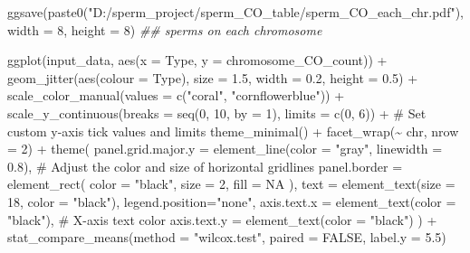 \documentclass[
  letterpaper,
  DIV=11,
  numbers=noendperiod]{scrreprt}
\newenvironment{Shaded}{\begin{snugshade}}{\end{snugshade}}
\newcommand{\AttributeTok}[1]{\textcolor[rgb]{0.40,0.45,0.13}{#1}}
\newcommand{\CommentTok}[1]{\textcolor[rgb]{0.37,0.37,0.37}{#1}}
\newcommand{\ConstantTok}[1]{\textcolor[rgb]{0.56,0.35,0.01}{#1}}
\newcommand{\DecValTok}[1]{\textcolor[rgb]{0.68,0.00,0.00}{#1}}
\newcommand{\DocumentationTok}[1]{\textcolor[rgb]{0.37,0.37,0.37}{\textit{#1}}}
\newcommand{\FloatTok}[1]{\textcolor[rgb]{0.68,0.00,0.00}{#1}}
\newcommand{\FunctionTok}[1]{\textcolor[rgb]{0.28,0.35,0.67}{#1}}
\newcommand{\NormalTok}[1]{\textcolor[rgb]{0.00,0.23,0.31}{#1}}
\newcommand{\SpecialCharTok}[1]{\textcolor[rgb]{0.37,0.37,0.37}{#1}}
\newcommand{\StringTok}[1]{\textcolor[rgb]{0.13,0.47,0.30}{#1}}
\begin{document}
\begin{codelisting}
\begin{Shaded}
\begin{Highlighting}[]
\FunctionTok{ggsave}\NormalTok{(}\FunctionTok{paste0}\NormalTok{(}\StringTok{"D:/sperm\_project/sperm\_CO\_table/sperm\_CO\_each\_chr.pdf"}\NormalTok{), }\AttributeTok{width =} \DecValTok{8}\NormalTok{, }\AttributeTok{height =} \DecValTok{8}\NormalTok{)  }
\DocumentationTok{\#\# sperms on each chromosome}

\FunctionTok{ggplot}\NormalTok{(input\_data, }\FunctionTok{aes}\NormalTok{(}\AttributeTok{x =}\NormalTok{ Type, }\AttributeTok{y =}\NormalTok{ chromosome\_CO\_count)) }\SpecialCharTok{+} 
  \FunctionTok{geom\_jitter}\NormalTok{(}\FunctionTok{aes}\NormalTok{(}\AttributeTok{colour =}\NormalTok{ Type), }\AttributeTok{size =} \FloatTok{1.5}\NormalTok{, }\AttributeTok{width =} \FloatTok{0.2}\NormalTok{, }\AttributeTok{height =} \FloatTok{0.5}\NormalTok{) }\SpecialCharTok{+} 
  \FunctionTok{scale\_color\_manual}\NormalTok{(}\AttributeTok{values =} \FunctionTok{c}\NormalTok{(}\StringTok{"coral"}\NormalTok{, }\StringTok{"cornflowerblue"}\NormalTok{)) }\SpecialCharTok{+}
  \FunctionTok{scale\_y\_continuous}\NormalTok{(}\AttributeTok{breaks =} \FunctionTok{seq}\NormalTok{(}\DecValTok{0}\NormalTok{, }\DecValTok{10}\NormalTok{, }\AttributeTok{by =} \DecValTok{1}\NormalTok{), }\AttributeTok{limits =} \FunctionTok{c}\NormalTok{(}\DecValTok{0}\NormalTok{, }\DecValTok{6}\NormalTok{)) }\SpecialCharTok{+}  \CommentTok{\# Set custom y{-}axis tick values and limits}
  \FunctionTok{theme\_minimal}\NormalTok{() }\SpecialCharTok{+}
  \FunctionTok{facet\_wrap}\NormalTok{(}\SpecialCharTok{\textasciitilde{}}\NormalTok{ chr, }\AttributeTok{nrow =} \DecValTok{2}\NormalTok{) }\SpecialCharTok{+}
  \FunctionTok{theme}\NormalTok{(}
    \AttributeTok{panel.grid.major.y =} \FunctionTok{element\_line}\NormalTok{(}\AttributeTok{color =} \StringTok{"gray"}\NormalTok{, }\AttributeTok{linewidth =} \FloatTok{0.8}\NormalTok{),  }\CommentTok{\# Adjust the color and size of horizontal gridlines}
    \AttributeTok{panel.border =} \FunctionTok{element\_rect}\NormalTok{(}
      \AttributeTok{color =} \StringTok{"black"}\NormalTok{,}
      \AttributeTok{size =} \DecValTok{2}\NormalTok{,}
      \AttributeTok{fill =} \ConstantTok{NA}
\NormalTok{    ),}
    \AttributeTok{text =} \FunctionTok{element\_text}\NormalTok{(}\AttributeTok{size =} \DecValTok{18}\NormalTok{, }\AttributeTok{color =} \StringTok{"black"}\NormalTok{),}
        \AttributeTok{legend.position=}\StringTok{"none"}\NormalTok{,}
        \AttributeTok{axis.text.x =} \FunctionTok{element\_text}\NormalTok{(}\AttributeTok{color =} \StringTok{"black"}\NormalTok{),  }\CommentTok{\# X{-}axis text color}
        \AttributeTok{axis.text.y =} \FunctionTok{element\_text}\NormalTok{(}\AttributeTok{color =} \StringTok{"black"}\NormalTok{)}
\NormalTok{  ) }\SpecialCharTok{+} \FunctionTok{stat\_compare\_means}\NormalTok{(}\AttributeTok{method =} \StringTok{"wilcox.test"}\NormalTok{, }\AttributeTok{paired =} \ConstantTok{FALSE}\NormalTok{, }\AttributeTok{label.y =} \FloatTok{5.5}\NormalTok{)}
\end{Highlighting}
\end{Shaded}

\end{codelisting}
\end{document}
